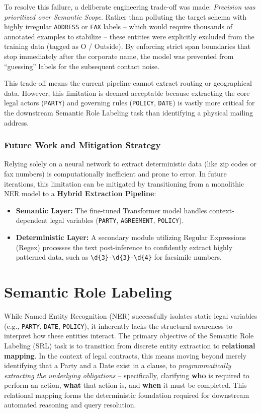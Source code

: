 \documentclass[twoside,final]{hcmut-report}
\begin{document}
To resolve this failure, a deliberate engineering trade-off was made: \textit{Precision was prioritized over Semantic Scope}. Rather than polluting the target schema with highly irregular \texttt{ADDRESS} or \texttt{FAX} labels -- which would require thousands of annotated examples to stabilize -- these entities were explicitly excluded from the training data (tagged as O / Outside). By enforcing strict span boundaries that stop immediately after the corporate name, the model was prevented from ``guessing'' labels for the subsequent contact noise.

\medskip

This trade-off means the current pipeline cannot extract routing or geographical data. However, this limitation is deemed acceptable because extracting the core legal actors (\texttt{PARTY}) and governing rules (\texttt{POLICY}, \texttt{DATE}) is vastly more critical for the downstream Semantic Role Labeling task than identifying a physical mailing address.

\subsubsection{Future Work and Mitigation Strategy}

Relying solely on a neural network to extract deterministic data (like zip codes or fax numbers) is computationally inefficient and prone to error. In future iterations, this limitation can be mitigated by transitioning from a monolithic NER model to a \textbf{Hybrid Extraction Pipeline}:

\begin{itemize}
  \item \textbf{Semantic Layer:} The fine-tuned Transformer model handles context-dependent legal variables (\texttt{PARTY}, \texttt{AGREEMENT}, \texttt{POLICY}).
  \item \textbf{Deterministic Layer:} A secondary module utilizing Regular Expressions (Regex) processes the text post-inference to confidently extract highly patterned data, such as \verb|\d{3}-\d{3}-\d{4}| for facsimile numbers.
\end{itemize}

\section{Semantic Role Labeling}
\label{task_2.2}

While Named Entity Recognition (NER) successfully isolates static legal variables (e.g., \texttt{PARTY}, \texttt{DATE}, \texttt{POLICY}), it inherently lacks the structural awareness to interpret how these entities interact. The primary objective of the Semantic Role Labeling (SRL) task is to transition from discrete entity extraction to \textbf{relational mapping}. In the context of legal contracts, this means moving beyond merely identifying that a Party and a Date exist in a clause, to \emph{programmatically extracting the underlying obligations} -- specifically, clarifying \textbf{who} is required to perform an action, \textbf{what} that action is, and \textbf{when} it must be completed. This relational mapping forms the deterministic foundation required for downstream automated reasoning and query resolution.
\end{document}
